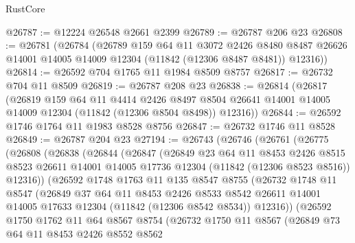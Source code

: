 \begin{lexlean}{RustCore}
\begin{coremodule}
@26787 := @12224 @26548 @2661 @2399
@26789 := @26787 @206 @23
@26808 := @26781
    (@26784
      (@26789
        @159
        @64
        @11
        @3072
        @2426
        @8480
        @8487
        @26626
        @14001
        @14005
        @14009
        @12304
        (@11842 (@12306 @8487 @8481))
        @12316))
@26814 := @26592 @704 @1765 @11 @1984 @8509 @8757
@26817 := @26732 @704 @11 @8509
@26819 := @26787 @208 @23
@26838 := @26814
    (@26817
      (@26819
        @159
        @64
        @11
        @4414
        @2426
        @8497
        @8504
        @26641
        @14001
        @14005
        @14009
        @12304
        (@11842 (@12306 @8504 @8498))
        @12316))
@26844 := @26592 @1746 @1764 @11 @1983 @8528 @8756
@26847 := @26732 @1746 @11 @8528
@26849 := @26787 @204 @23
@27194 := @26743
    (@26746
      (@26761
        (@26775
          (@26808
            (@26838
              (@26844
                (@26847
                  (@26849
                    @23
                    @64
                    @11
                    @8453
                    @2426
                    @8515
                    @8523
                    @26611
                    @14001
                    @14005
                    @17736
                    @12304
                    (@11842 (@12306 @8523 @8516))
                    @12316))
                (@26592
                  @1748
                  @1763
                  @11
                  @135
                  @8547
                  @8755
                  (@26732
                    @1748
                    @11
                    @8547
                    (@26849
                      @37
                      @64
                      @11
                      @8453
                      @2426
                      @8533
                      @8542
                      @26611
                      @14001
                      @14005
                      @17633
                      @12304
                      (@11842 (@12306 @8542 @8534))
                      @12316))
                  (@26592
                    @1750
                    @1762
                    @11
                    @64
                    @8567
                    @8754
                    (@26732
                      @1750
                      @11
                      @8567
                      (@26849
                        @73
                        @64
                        @11
                        @8453
                        @2426
                        @8552
                        @8562

\end{coremodule}
\end{lexlean}
